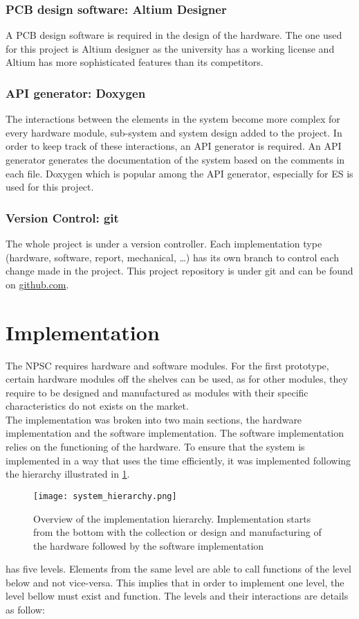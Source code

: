  \subsubsection{PCB design software: Altium Designer}
A PCB design software is required in the design of the hardware. The one used for this project is Altium designer as the university has a working license and Altium has more sophisticated features than its competitors. 
\subsubsection{API generator: Doxygen}
The interactions between the elements in the system become more complex for every hardware module, sub-system and system design added to the project. In order to keep track of these interactions, an API generator is required. An API generator generates the documentation of the system based on the comments in each file. Doxygen which is popular among the API generator, especially for ES is used for this project.
\subsubsection{Version Control: git}
The whole project is under a version controller. Each implementation type (hardware, software, report, mechanical, \ldots) has its own branch to control each change made in the project. This project repository is under git and can be found on \href{https://github.com/Kojey/NPSC}{github.com}. 
\section{Implementation}
The NPSC requires hardware and software modules. For the first prototype, certain hardware modules off the shelves can be used, as for other modules, they require to be designed and manufactured as modules with their specific characteristics do not exists on the market.\\
The implementation was broken into two main sections, the hardware implementation and the software implementation. The software implementation relies on the functioning of the hardware. To ensure that the system is implemented in a way that uses the time efficiently, it was implemented following the hierarchy illustrated in \cref{fig:system_hierarchy}. 
\begin{figure}[ht]
\centering
\texttt{[image: system\_hierarchy.png]}
\caption{Overview of the implementation hierarchy. Implementation starts from the bottom with the collection or design and manufacturing of the hardware followed by the software implementation}
\label{fig:system_hierarchy}
\end{figure}
 has five levels. Elements from the same level are able to call functions of the level below and not vice-versa. This implies that in order to implement one level, the level bellow must exist and function. The levels and their interactions are details as follow:
